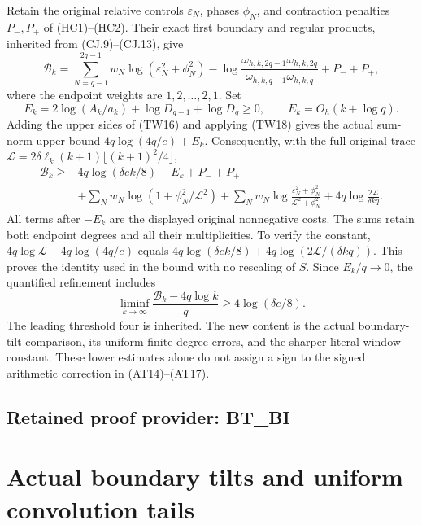 \documentclass[11pt,a4paper]{article}
\begin{document}
Retain the original relative controls $\varepsilon_N$, phases $\phi_N$,
and contraction penalties $P_-,P_+$ of (HC1)--(HC2).  Their exact first
boundary and regular products, inherited from (CJ.9)--(CJ.13), give
\[
 \mathcal B_k=\sum_{N=q-1}^{2q-1}w_N
 \log(\varepsilon_N^2+\phi_N^2)
 -\log\frac{\omega_{h,k,2q-1}\omega_{h,k,2q}}
                {\omega_{h,k,q-1}\omega_{h,k,q}}+P_-+P_+,
\]
where the endpoint weights are $1,2,\ldots,2,1$.  Set
\[
 E_k=2\log(A_k/a_k)+\log D_{q-1}+\log D_q\geq0,
 \qquad E_k=O_h(k+\log q).
\]
Adding the upper sides of (TW16) and applying (TW18) gives the
actual sum-norm upper bound $4q\log(4q/e)+E_k$.
Consequently, with the full original trace
$\mathcal L=2\delta\ell_k(k+1)\lfloor(k+1)^2/4\rfloor$,
\[
 \begin{split}
 \mathcal B_k\geq{}&4q\log(\delta e k/8)-E_k+P_-+P_+\\
 &+\sum_Nw_N\log(1+\phi_N^2/\mathcal L^2)
 +\sum_Nw_N\log\frac{\varepsilon_N^2+\phi_N^2}
                           {\mathcal L^2+\phi_N^2}
 +4q\log\frac{2\mathcal L}{\delta kq}.
 \end{split}\tag{TW20}
\]
All terms after $-E_k$ are the displayed original nonnegative costs.
The sums retain both endpoint degrees and all their multiplicities.
To verify the constant, $4q\log\mathcal L-4q\log(4q/e)$ equals
$4q\log(\delta e k/8)+4q\log(2\mathcal L/(\delta kq))$.
This proves the identity used in the bound with no rescaling of $S$.
Since $E_k/q\to0$, the quantified refinement includes
\[
 \liminf_{k\to\infty}
 \frac{\mathcal B_k-4q\log k}{q}
 \geq4\log(\delta e/8).
 \tag{TW21}
\]
The leading threshold four is inherited.  The new content is the
actual boundary-tilt comparison, its uniform finite-degree errors,
and the sharper literal window constant.  These lower estimates
alone do not assign a sign to the signed arithmetic correction in
(AT14)--(AT17).


\clearpage
\subsection*{Retained proof provider: BT\_BI}

\section{Actual boundary tilts and uniform convolution tails}\label{actual-boundary-tilts-and-uniform-convolution-tails}
\end{document}
